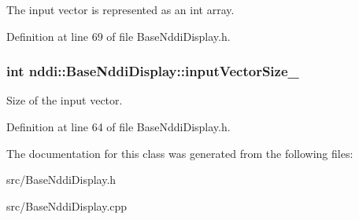 The input vector is represented as an int array. 



Definition at line 69 of file BaseNddiDisplay.h.

\hypertarget{classnddi_1_1_base_nddi_display_a8ea6b8a02ce1680040cb828facb98c5a}{
\subsubsection[{inputVectorSize\_\-}]{\setlength{\rightskip}{0pt plus 5cm}int {\bf nddi::BaseNddiDisplay::inputVectorSize\_\-}}}
\label{classnddi_1_1_base_nddi_display_a8ea6b8a02ce1680040cb828facb98c5a}


Size of the input vector. 



Definition at line 64 of file BaseNddiDisplay.h.



The documentation for this class was generated from the following files:\begin{DoxyCompactItemize}
\item 
src/BaseNddiDisplay.h\item 
src/BaseNddiDisplay.cpp\end{DoxyCompactItemize}
